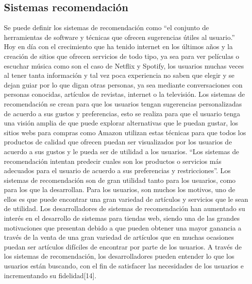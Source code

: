 \documentclass[12pt,letterpaper,openany]{book}
\begin{document}
\subsection{Sistemas recomendación}
Se puede definir los sistemas de recomendación como “el conjunto de herramientas de software y técnicas que ofrecen sugerencias útiles al usuario.” Hoy en día con el crecimiento que ha tenido internet en los últimos años y la creación de sitios que ofrecen servicios de todo tipo, ya sea para ver películas o escuchar música como son el caso de Netflix y Spotify, los usuarios muchas veces al tener tanta información y tal vez poca experiencia no saben que elegir y se dejan guiar por lo que digan otras personas, ya sea mediante conversaciones con personas conocidas, artículos de revistas, internet o la televisión.
\vspace{5mm}\newline
Los sistemas de recomendación se crean para que los usuarios tengan sugerencias personalizadas de acuerdo a sus gustos y preferencias, esto se realiza para que el usuario tenga una visión amplia de que puede explorar alternativas que le puedan gustar, los sitios webs para compras como Amazon utilizan estas técnicas para que todos los productos de calidad que ofrecen puedan ser visualizados por los usuarios de acuerdo a sus gustos y le pueda ser de utilidad a los usuarios. “Los sistemas de recomendación intentan predecir cuales son los productos o servicios más adecuados para el usuario de acuerdo a sus preferencias y restricciones”.
\vspace{5mm}\newline
Los sistemas de recomendación son de gran utilidad tanto para los usuarios, como para los que la desarrollan. Para los usuarios, son muchos los motivos, uno de ellos es que puede encontrar una gran variedad de artículos y servicios que le sean de utilidad. Los desarrolladores de sistemas de recomendación han aumentado su interés en el desarrollo de sistemas para tiendas web, siendo una de las grandes motivaciones que presentan debido a que pueden obtener una mayor ganancia a través de la venta de una gran variedad de artículos que en muchas ocasiones puedan ser artículos difíciles de encontrar por parte de los usuarios. 
\vspace{5mm}\newline
A través de los sistemas de recomendación, los desarrolladores pueden entender lo que los usuarios están buscando, con el fin de satisfacer las necesidades de los usuarios e incrementando su fidelidad[14]. 
\vspace{5mm}\newline
\end{document}
